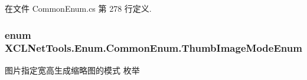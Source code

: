 在文件 Common\-Enum.\-cs 第 278 行定义.

\hypertarget{class_x_c_l_net_tools_1_1_enum_1_1_common_enum_abb6d9d6cd508fc9ced27b814afb38974}{
\subsubsection[{Thumb\-Image\-Mode\-Enum}]{\setlength{\rightskip}{0pt plus 5cm}enum {\bf X\-C\-L\-Net\-Tools.\-Enum.\-Common\-Enum.\-Thumb\-Image\-Mode\-Enum}}}\label{class_x_c_l_net_tools_1_1_enum_1_1_common_enum_abb6d9d6cd508fc9ced27b814afb38974}


图片指定宽高生成缩略图的模式 枚举 

